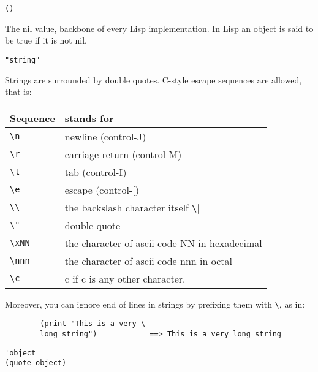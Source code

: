 
{\usagefont\begin{verbatim}
()
\end{verbatim}}\usageupspace

The nil value, backbone of every Lisp implementation. In Lisp an object is
said to be true if it is not nil.


{\usagefont\begin{verbatim}
"string"
\end{verbatim}}\usageupspace

Strings are surrounded by double quotes. C-style escape sequences are
allowed, that is: 

\begin{center}\begin{tabular}{ll}
{\bf Sequence} & {\bf stands for} \\ \hline
\verb|\n| & newline (control-J)\\
\verb|\r| & carriage return (control-M)\\
\verb|\t| & tab (control-I)\\
\verb|\e| & escape (control-[)\\
\verb|\\| & the backslash character itself \verb|\|\\
\verb|\"| & double quote\\
\verb|\xNN| & the character of ascii code NN in hexadecimal\\ 
\verb|\nnn| & the character of ascii code nnn in octal\\
\verb|\c| & c if c is any other character.\\
\end{tabular} \end{center} 

Moreover, you can ignore end of lines in strings by prefixing them with
\verb"\", as in:

{\exemplefont\begin{verbatim}
        (print "This is a very \
        long string")            ==> This is a very long string
\end{verbatim}}

        
{\usagefont\begin{verbatim}
'object
(quote object)
\end{verbatim}}\usageupspace

